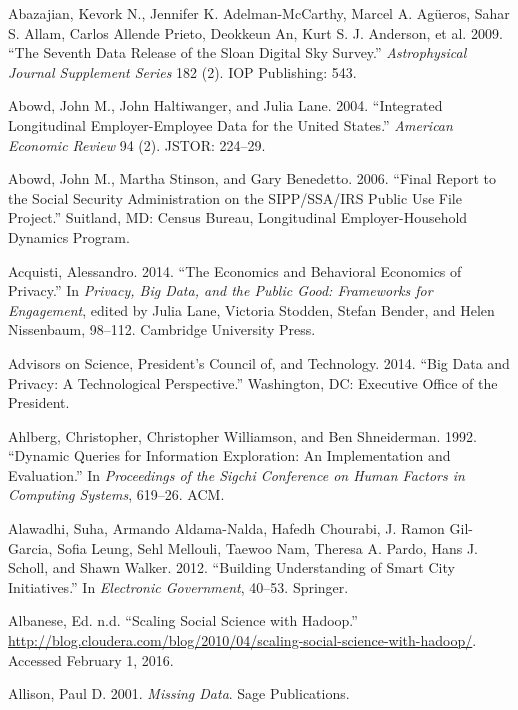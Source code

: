 \documentclass[]{krantz}
\begin{document}
\hypertarget{ref-abazajian2009seventh}{}
Abazajian, Kevork N., Jennifer K. Adelman-McCarthy, Marcel A. Agüeros,
Sahar S. Allam, Carlos Allende Prieto, Deokkeun An, Kurt S. J. Anderson,
et al. 2009. ``The Seventh Data Release of the Sloan Digital Sky
Survey.'' \emph{Astrophysical Journal Supplement Series} 182 (2). IOP
Publishing: 543.

\hypertarget{ref-abowd2004integrated}{}
Abowd, John M., John Haltiwanger, and Julia Lane. 2004. ``Integrated
Longitudinal Employer-Employee Data for the United States.''
\emph{American Economic Review} 94 (2). JSTOR: 224--29.

\hypertarget{ref-abowd2006final}{}
Abowd, John M., Martha Stinson, and Gary Benedetto. 2006. ``Final Report
to the Social Security Administration on the SIPP/SSA/IRS Public Use
File Project.'' Suitland, MD: Census Bureau, Longitudinal
Employer-Household Dynamics Program.

\hypertarget{ref-Acquisti2014}{}
Acquisti, Alessandro. 2014. ``The Economics and Behavioral Economics of
Privacy.'' In \emph{Privacy, Big Data, and the Public Good: Frameworks
for Engagement}, edited by Julia Lane, Victoria Stodden, Stefan Bender,
and Helen Nissenbaum, 98--112. Cambridge University Press.

\hypertarget{ref-house2014big}{}
Advisors on Science, President's Council of, and Technology. 2014. ``Big
Data and Privacy: A Technological Perspective.'' Washington, DC:
Executive Office of the President.

\hypertarget{ref-ahlberg1992dynamic}{}
Ahlberg, Christopher, Christopher Williamson, and Ben Shneiderman. 1992.
``Dynamic Queries for Information Exploration: An Implementation and
Evaluation.'' In \emph{Proceedings of the Sigchi Conference on Human
Factors in Computing Systems}, 619--26. ACM.

\hypertarget{ref-alawadhi2012building}{}
Alawadhi, Suha, Armando Aldama-Nalda, Hafedh Chourabi, J. Ramon
Gil-Garcia, Sofia Leung, Sehl Mellouli, Taewoo Nam, Theresa A. Pardo,
Hans J. Scholl, and Shawn Walker. 2012. ``Building Understanding of
Smart City Initiatives.'' In \emph{Electronic Government}, 40--53.
Springer.

\hypertarget{ref-socialhadoop}{}
Albanese, Ed. n.d. ``Scaling Social Science with Hadoop.''
\url{http://blog.cloudera.com/blog/2010/04/scaling-social-science-with-hadoop/}.
Accessed February 1, 2016.

\hypertarget{ref-allison2001missing}{}
Allison, Paul D. 2001. \emph{Missing Data}. Sage Publications.
\end{document}
